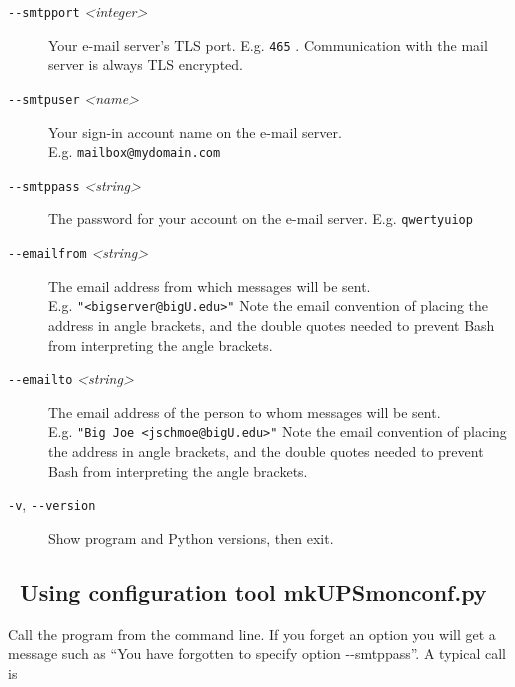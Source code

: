 \documentclass[12pt]{article}
\newlength{\headersep}\setlength{\headersep}{3mm}
\newcommand{\Hsep}{\hspace{\headersep}}
\newcommand{\mkUPSmonconf}{\mbox{\textcolor{UPSMONCOLOUR}{mkUPSmonconf.py}}}
\begin{document}
\begin{description}
\item[\texttt{-\/-smtpport} \textit{<integer>}] \hspace{7mm} Your e-mail
  server's TLS port. E.g. \texttt{465} . Communication with the mail server is
  always TLS encrypted.

\item[\texttt{-\/-smtpuser} \textit{<name>}] \hspace{6mm} Your sign-in account
  name on the e-mail server. \\ E.g.
  \texttt{mailbox@mydomain.{\allowbreak}com}

\item[\texttt{-\/-smtppass} \textit{<string>}] \hspace{7mm} The password for
  your account on the e-mail server. E.g. \texttt{qwertyuiop}

\item[\texttt{-\/-emailfrom} \textit{<string>}] \hspace{7mm} The email address
  from which messages will be sent. \\ E.g.  \texttt{"<bigserver@bigU.edu>"}
  Note the email convention of placing the address in angle brackets, and the
  double quotes needed to prevent Bash from interpreting the angle brackets.

\item[\texttt{-\/-emailto} \textit{<string>}] \hspace{7mm} The email address
  of the person to whom messages will be sent. \\ E.g.  \texttt{"Big Joe
    <jschmoe@bigU.edu>"} Note the email convention of placing the address in
  angle brackets, and the double quotes needed to prevent Bash from
  interpreting the angle brackets.

\item[\texttt{-v}, \texttt{-\/-version}] \hspace{7mm} Show program and Python
  versions, then exit.

\end{description}

\subsection{\Hsep\ Using configuration tool \mkUPSmonconf}\label{section:usemkUPSmonconf}

Call the program from the command line.  If you forget an option you will get
a message such as ``You have forgotten to specify option -\/-smtppass''.  A
typical call is
\end{document}
